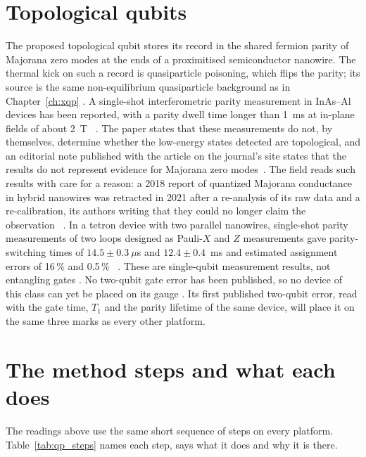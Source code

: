 \section{Topological qubits}\label{sec:qp_topo}
The proposed topological qubit stores its record in the shared fermion parity of Majorana zero modes at the ends of a proximitised
semiconductor nanowire. The thermal kick on such a record is quasiparticle poisoning, which flips the parity; its source is the same
non-equilibrium quasiparticle background as in Chapter~\ref{ch:xqp} \interp. A single-shot interferometric parity measurement in
InAs--Al devices has been reported, with a parity dwell time longer than 1~ms at in-plane fields of about 2~T~\cite{Aghaee2025}
\observed. The paper states that these measurements do not, by themselves, determine whether the low-energy states detected are topological,
and an editorial note published with the article on the journal's site states that the results do not represent evidence for Majorana zero modes~\cite{Aghaee2025}. The field reads such results with care for a reason: a 2018 report of quantized Majorana conductance in hybrid nanowires was retracted
in 2021 after a re-analysis of its raw data and a re-calibration, its authors writing that they could no longer claim the
observation~\cite{Zhang2021Retraction} \observed. In a tetron device with two parallel nanowires, single-shot parity measurements of two
loops designed as Pauli-$X$ and $Z$ measurements gave parity-switching times of $14.5\pm0.3~\mu$s and $12.4\pm0.4$~ms and estimated
assignment errors of 16\,\% and 0.5\,\%~\cite{Tetron2026} \observed. These are single-qubit measurement results, not entangling gates
\interp. No two-qubit
gate error has been published, so no device of this class can yet be placed on its gauge \openprob. Its first published two-qubit error,
read with the gate time, $T_1$ and the parity lifetime of the same device, will place it on the same three marks as every other platform.

\section{The method steps and what each does}\label{sec:qp_steps}
The readings above use the same short sequence of steps on every platform. Table~\ref{tab:qp_steps} names each step, says what it does and
why it is there.

